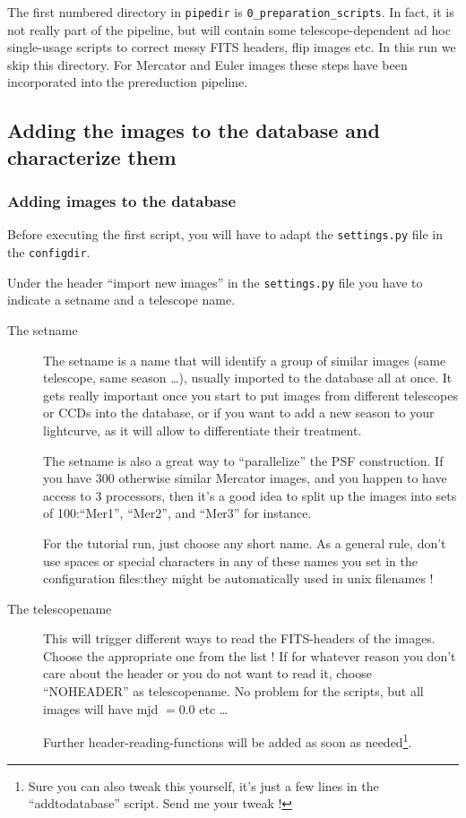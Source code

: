 The first numbered directory in \verb+pipedir+ is  \verb+0_preparation_scripts+. In fact, it is not really part of the pipeline, but will contain some telescope-dependent ad hoc single-usage scripts to correct messy FITS headers, flip images etc. In this run we skip this directory. For Mercator and Euler images these steps have been incorporated into the prereduction pipeline.


\subsection{Adding the images to the database and characterize them}

\subsubsection{Adding images to the database}

Before executing the first script, you will have to adapt the \verb+settings.py+ file in the \verb+configdir+.

Under the header ``import new images'' in the \verb+settings.py+ file you have to indicate a setname and a telescope name.

\begin{description}
 \item[The setname] The setname is a name that will identify a group of similar images (same telescope, same season \ldots), usually imported to the database all at once. It gets really important once you start to put images from different telescopes or CCDs into the database, or if you want to add a new season to your lightcurve, as it will allow to differentiate their treatment.

The setname is also a great way to ``parallelize'' the PSF construction. If you have 300 otherwise similar Mercator images, and you happen to have access to 3 processors, then it's a good idea to split up the images into sets of 100:``Mer1'', ``Mer2'', and ``Mer3'' for instance.

For the tutorial run, just choose any short name. As a general rule, don't use spaces or special characters in any of these names you set in the configuration files:they might be automatically used in unix filenames !

\item[The telescopename] This will trigger different ways to read the FITS-headers of the images. Choose the appropriate one from the list !
If for whatever reason you don't care about the header or you do not want to read it, choose ``NOHEADER'' as telescopename. No problem for the scripts, but all images will have mjd $ = 0.0$ etc \ldots

Further header-reading-functions will be added as soon as needed\footnote{Sure you can also tweak this yourself, it's just a few lines in the ``addtodatabase'' script. Send me your tweak !}.

\end{description}



